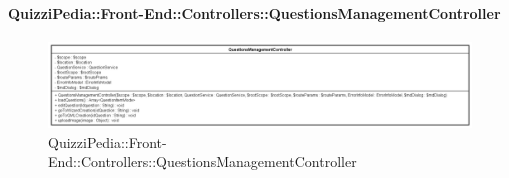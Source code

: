 \paragraph[QuizziPedia::Front-End::Controllers\\::QuestionsManagementController]{QuizziPedia::Front-End::Controllers::QuestionsManagementController}
\begin{figure} [ht]
	\centering
	\includegraphics[scale=0.6]{UML/Classi/Front-End/QuizziPedia_Front-end_Controller_QuestionsManagementController.png}
	\caption{QuizziPedia::Front-End::Controllers::QuestionsManagementController}
\end{figure} \FloatBarrier
